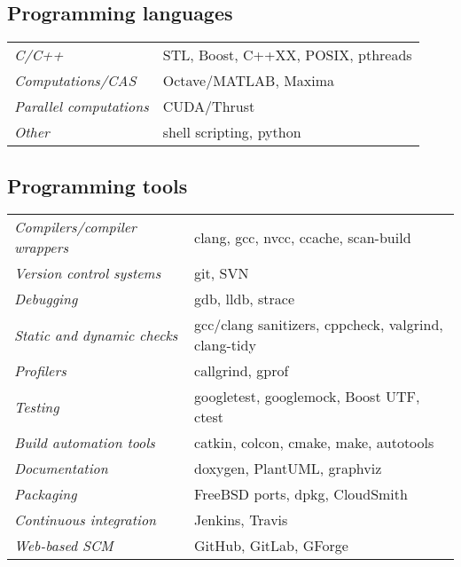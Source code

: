 \documentclass[a4paper,10pt]{report}
\begin{document}
\begin{adjustwidth}{0.5cm}{0pt}
\vspace{0.2cm}
\subsection{Programming languages}
\begin{adjustwidth}{0.5cm}{0pt}
    \begin{tabularx}{\linewidth}{l X}
        {\it C/C++}                 &   STL, Boost, C++XX, POSIX, pthreads\\
        {\it Computations/CAS}      &   Octave/MATLAB, Maxima\\
        {\it Parallel computations} &   CUDA/Thrust\\
        {\it Other}                 &   shell scripting, python
    \end{tabularx}
\end{adjustwidth}

\vspace{0.2cm}
\subsection{Programming tools}
\begin{adjustwidth}{0.5cm}{0pt}
    \begin{tabularx}{\linewidth}{l X}
        {\it Compilers/compiler wrappers}   & clang, gcc, nvcc, ccache, scan-build \\
        {\it Version control systems}       & git, SVN \\
        {\it Debugging}                     & gdb, lldb, strace \\
        {\it Static and dynamic checks}     & gcc/clang sanitizers, cppcheck, valgrind, clang-tidy \\
        {\it Profilers}                     & callgrind, gprof \\
        {\it Testing}                       & googletest, googlemock, Boost UTF, ctest \\
        {\it Build automation tools}        & catkin, colcon, cmake, make, autotools \\
        {\it Documentation}                 & doxygen, PlantUML, graphviz \\
        {\it Packaging}                     & FreeBSD ports, dpkg, CloudSmith \\
        {\it Continuous integration}        & Jenkins, Travis \\
        {\it Web-based SCM}                 & GitHub, GitLab, GForge
    \end{tabularx}
\end{adjustwidth}


\end{adjustwidth}
\end{document}
